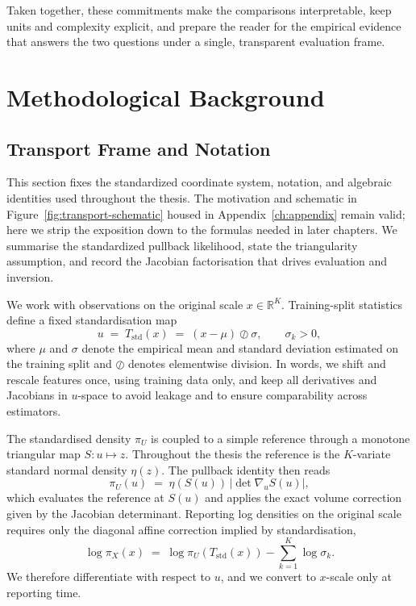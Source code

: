 \documentclass[11pt,a4paper,twoside]{book}\usepackage[]{graphicx}\usepackage[]{xcolor}
\begin{document}
Taken together, these commitments make the comparisons interpretable, keep units and complexity explicit, and prepare the reader for the empirical evidence that answers the two questions under a single, transparent evaluation frame.





\chapter{Methodological Background}\label{ch:background}

\section{Transport Frame and Notation}\label{sec:transport-frame}

This section fixes the standardized coordinate system, notation, and algebraic identities used throughout the thesis. The motivation and schematic in Figure~\ref{fig:transport-schematic} housed in Appendix~\ref{ch:appendix} remain valid; here we strip the exposition down to the formulas needed in later chapters. We summarise the standardized pullback likelihood, state the triangularity assumption, and record the Jacobian factorisation that drives evaluation and inversion.

We work with observations on the original scale $x \in \mathbb{R}^K$. Training-split statistics define a fixed standardisation map
\begin{equation}
  u \;=\; T_{\mathrm{std}}(x) \;=\; (x-\mu)\oslash\sigma,\qquad \sigma_k>0,\label{eq:transport-standardise}
\end{equation}
where $\mu$ and $\sigma$ denote the empirical mean and standard deviation estimated on the training split and $\oslash$ denotes elementwise division. In words, we shift and rescale features once, using training data only, and keep all derivatives and Jacobians in $u$-space to avoid leakage and to ensure comparability across estimators.

The standardised density $\pi_U$ is coupled to a simple reference through a monotone triangular map $S:u\mapsto z$. Throughout the thesis the reference is the $K$-variate standard normal density $\eta(z)$. The pullback identity then reads
\begin{equation}
  \pi_U(u) \;=\; \eta\!\left(S(u)\right)\,\left|\det\nabla_u S(u)\right|,\label{eq:transport-pullback}
\end{equation}
which evaluates the reference at $S(u)$ and applies the exact volume correction given by the Jacobian determinant. Reporting log densities on the original scale requires only the diagonal affine correction implied by standardisation,
\begin{equation}
  \log \pi_X(x) \;=\; \log \pi_U\!\left(T_{\mathrm{std}}(x)\right) - \sum_{k=1}^{K}\log\sigma_k.\label{eq:transport-affine}
\end{equation}
We therefore differentiate with respect to $u$, and we convert to $x$-scale only at reporting time.
\end{document}
